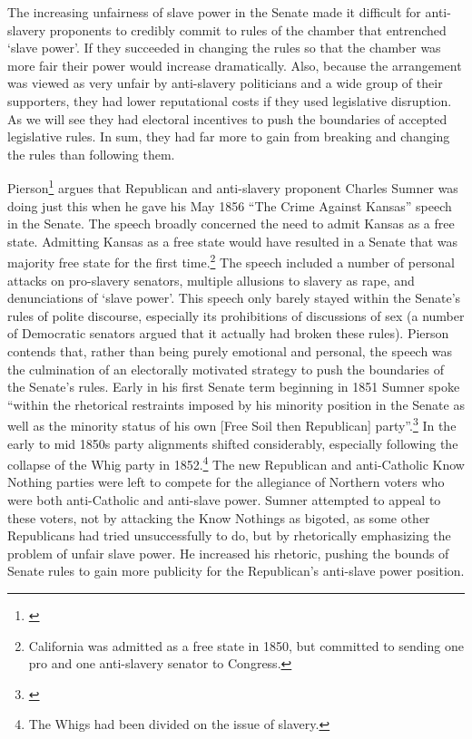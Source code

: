 \documentclass[a4paper]{article}\usepackage[]{graphicx}\usepackage[]{color}
\begin{document}
The increasing unfairness of slave power in the Senate made it difficult for anti-slavery proponents to credibly commit to rules of the chamber that entrenched `slave power'. If they succeeded in changing the rules so that the chamber was more fair their power would increase dramatically. Also, because the arrangement was viewed as very unfair by anti-slavery politicians and a wide group of their supporters, they had lower reputational costs if they used legislative disruption. As we will see they had electoral incentives to push the boundaries of accepted legislative rules. In sum, they had far more to gain from breaking and changing the rules than following them.

Pierson\footnote{\citealt{Pierson1995}} argues that Republican and anti-slavery proponent Charles Sumner was doing just this when he gave his May 1856 ``The Crime Against Kansas'' speech in the Senate. The speech broadly concerned the need to admit Kansas as a free state. Admitting Kansas as a free state would have resulted in a Senate that was majority free state for the first time.\footnote{California was admitted as a free state in 1850, but committed to sending one pro and one anti-slavery senator to Congress.} The speech included a number of personal attacks on pro-slavery senators, multiple allusions to slavery as rape, and denunciations of `slave power'. This speech only barely stayed within the Senate's rules of polite discourse, especially its prohibitions of discussions of sex (a number of Democratic senators argued that it actually had broken these rules). Pierson contends that, rather than being purely emotional and personal, the speech was the culmination of an electorally motivated strategy to push the boundaries of the Senate's rules. Early in his first Senate term beginning in 1851 Sumner spoke ``within the rhetorical restraints imposed by his minority position in the Senate as well as the minority status of his own [Free Soil then Republican] party''.\footnote{\citealt[534]{Pierson1995}} In the early to mid 1850s party alignments shifted considerably, especially following the collapse of the Whig party in 1852.\footnote{The Whigs had been divided on the issue of slavery.} The new Republican and anti-Catholic Know Nothing parties were left to compete for the allegiance of Northern voters who were both anti-Catholic and anti-slave power. Sumner attempted to appeal to these voters, not by attacking the Know Nothings as bigoted, as some other Republicans had tried unsuccessfully to do, but by rhetorically emphasizing the problem of unfair slave power. He increased his rhetoric, pushing the bounds of Senate rules to gain more publicity for the Republican's anti-slave power position.   
\end{document}
